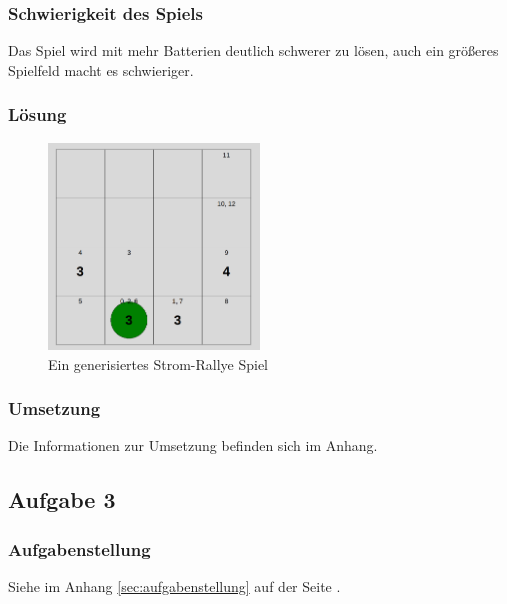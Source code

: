 \documentclass[a4paper,12pt,arial]{scrartcl}
\begin{document}
\subsubsection{Schwierigkeit des Spiels}
Das Spiel wird mit mehr Batterien deutlich schwerer zu lösen, auch ein größeres Spielfeld  macht es schwieriger.
\subsubsection{Lösung}
\begin{figure}[h]
    \centering
    \includegraphics[width=0.5\textwidth]{aufgabe1_2_solution.png}
    \caption{Ein generisiertes Strom-Rallye Spiel}
    \label{fig:loesung2}
\end{figure}
\subsubsection{Umsetzung}
Die Informationen zur Umsetzung befinden sich im Anhang.

\subsection{Aufgabe 3}
\subsubsection{Aufgabenstellung}
Siehe im Anhang \ref{sec:aufgabenstellung} auf der Seite \pageref{sec:aufgabenstellung}.
\end{document}
